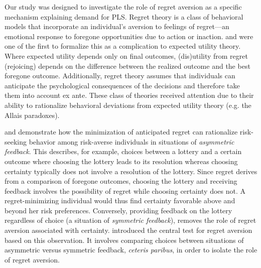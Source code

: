 \documentclass[11pt]{article}
\begin{document}

		Our study was designed to investigate the role of regret aversion as a specific mechanism explaining demand for PLS. Regret theory is a class of behavioral models that incorporate an individual's aversion to feelings of regret---an emotional response to foregone opportunities due to action or inaction. \textcite{bell_risk_1983} and \textcite{loomes_regret_1982} were one of the first to formalize this as a complication to expected utility theory. Where expected utility depends only on final outcomes, (dis)utility from regret (rejoicing) depends on the difference between the realized outcome and the best foregone outcome. Additionally, regret theory assumes that individuals can anticipate the psychological consequences of the decisions and therefore take them into account ex ante. These class of theories received attention due to their ability to rationalize behavioral deviations from expected utility theory (e.g. the Allais paradoxes).

		\textcite{zeelenberg_consequences_1996} and \textcite{zeelenberg_consequences_2004} demonstrate how the minimization of anticipated regret can rationalize risk-seeking behavior among risk-averse individuals in situations of \textit{asymmetric feedback}. This describes, for example, choices between a lottery and a certain outcome where choosing the lottery leads to its resolution whereas choosing certainty typically does not involve a resolution of the lottery. Since regret derives from a comparison of foregone outcomes, choosing the lottery and receiving feedback involves the possibility of regret while choosing certainty does not. A regret-minimizing individual would thus find certainty favorable above and beyond her risk preferences. Conversely, providing feedback on the lottery regardless of choice (a situation of \emph{symmetric feedback}), removes the role of regret aversion associated with certainty. \textcite{zeelenberg_consequences_1996} introduced the central test for regret aversion based on this observation. It involves comparing choices between situations of asymmetric versus symmetric feedback, \textit{ceteris paribus}, in order to isolate the role of regret aversion. 

\end{document}
